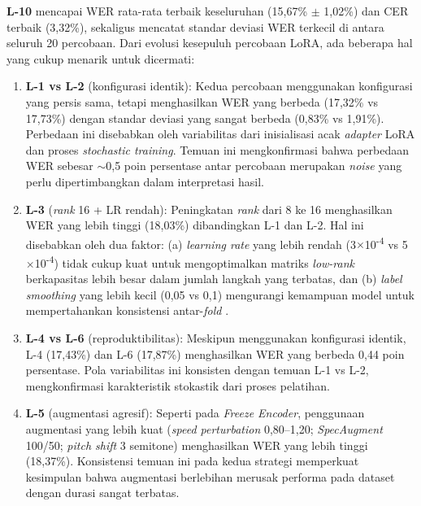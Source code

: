 \textbf{L-10} mencapai WER rata-rata terbaik keseluruhan (15,67\% $\pm$ 1,02\%) dan CER terbaik (3,32\%), sekaligus mencatat standar deviasi WER terkecil di antara seluruh 20 percobaan. Dari evolusi kesepuluh percobaan LoRA, ada beberapa hal yang cukup menarik untuk dicermati:

\begin{enumerate}
    \item \textbf{L-1 vs L-2} (konfigurasi identik): Kedua percobaan menggunakan konfigurasi yang persis sama, tetapi menghasilkan WER yang berbeda (17,32\% vs 17,73\%) dengan standar deviasi yang sangat berbeda (0,83\% vs 1,91\%). Perbedaan ini disebabkan oleh variabilitas dari inisialisasi acak \textit{adapter} LoRA dan proses \textit{stochastic training}. Temuan ini mengkonfirmasi bahwa perbedaan WER sebesar $\sim$0,5 poin persentase antar percobaan merupakan \textit{noise} yang perlu dipertimbangkan dalam interpretasi hasil.

    \item \textbf{L-3} (\textit{rank} 16 + LR rendah): Peningkatan \textit{rank} dari 8 ke 16 menghasilkan WER yang lebih tinggi (18,03\%) dibandingkan L-1 dan L-2. Hal ini disebabkan oleh dua faktor: (a) \textit{learning rate} yang lebih rendah (3$\times$10\textsuperscript{-4} vs 5$\times$10\textsuperscript{-4}) tidak cukup kuat untuk mengoptimalkan matriks \textit{low-rank} berkapasitas lebih besar dalam jumlah langkah yang terbatas, dan (b) \textit{label smoothing} yang lebih kecil (0,05 vs 0,1) mengurangi kemampuan model untuk mempertahankan konsistensi antar-\textit{fold} \cite{szegedy2016rethinking}.

    \item \textbf{L-4 vs L-6} (reproduktibilitas): Meskipun menggunakan konfigurasi identik, L-4 (17,43\%) dan L-6 (17,87\%) menghasilkan WER yang berbeda 0,44 poin persentase. Pola variabilitas ini konsisten dengan temuan L-1 vs L-2, mengkonfirmasi karakteristik stokastik dari proses pelatihan.

    \item \textbf{L-5} (augmentasi agresif): Seperti pada \textit{Freeze Encoder}, penggunaan augmentasi yang lebih kuat (\textit{speed perturbation} 0,80--1,20; \textit{SpecAugment} 100/50; \textit{pitch shift} 3 semitone) \cite{park2019specaugment, ko2015audio} menghasilkan WER yang lebih tinggi (18,37\%). Konsistensi temuan ini pada kedua strategi memperkuat kesimpulan bahwa augmentasi berlebihan merusak performa pada dataset dengan durasi sangat terbatas.


\end{enumerate}
